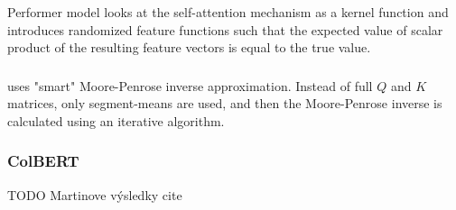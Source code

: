 Performer model \citep{performer} looks at the self-attention mechanism as a kernel function and introduces randomized feature functions such that the expected value of scalar product %
of the resulting feature vectors is equal to the true value.

\subsubsection{\nystr}

\nystr{} \citep{nystrom} uses "smart" Moore-Penrose inverse approximation. Instead of full $Q$ and $K$ matrices, only segment-means are used, and then the Moore-Penrose inverse is calculated using an iterative algorithm.

\subsubsection{ColBERT}
TODO Martinove výsledky cite


